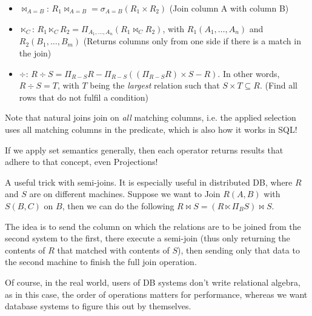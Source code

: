\begin{itemize}
          (Join with custom predicate $\theta$)
    \item {} $\bowtie_{A = B}$: $R_1 \bowtie_{A = B} = \sigma_{A = B}(R_1 \times R_2)$
          (Join column A with column B)
    \item {} $\ltimes_C$: $R_1 \ltimes_C R_2 = \Pi_{A_1, \ldots, A_n}(R_1 \bowtie_C R_2)$, with $R_1(A_1, \ldots, A_n)$ and $R_2(B_1, \ldots, B_m)$
          (Returns columns only from one side if there is a match in the join)
    \item {} $\div$: $R \div S = \Pi_{R - S} R - \Pi_{R - S}((\Pi_{R - S} R) \times S - R)$.
          In other words, $R \div S = T$, with $T$ being the \textit{largest} relation such that $S \times T \subseteq R$.
          (Find all rows that do not fulfil a condition)
\end{itemize}
Note that natural joins join on \textit{all} matching columns, i.e. the applied selection uses all matching columns in the predicate,
which is also how it works in SQL!

If we apply set semantics generally, then each operator returns results that adhere to that concept, even Projections!

 A useful trick with semi-joins. It is especially useful in distributed DB, where $R$ and $S$ are on different machines.
Suppose we want to Join $R(A, B)$ with $S(B, C)$ on $B$, then we can do the following $R \bowtie S = (R \ltimes \Pi_B S) \bowtie S$.

The idea is to send the column on which the relations are to be joined from the second system to the first,
there execute a semi-join (thus only returning the contents of $R$ that matched with contents of $S$),
then sending only that data to the second machine to finish the full join operation.

Of course, in the real world, users of DB systems don't write relational algebra, as in this case, the order of operations matters for performance,
whereas we want database systems to figure this out by themselves.


